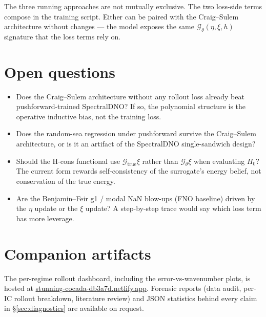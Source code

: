 \documentclass[11pt,letterpaper]{article}
\newcommand{\Gop}{\mathcal{G}}
\begin{document}
\noindent
The three running approaches are not mutually exclusive. The two
loss-side terms compose in the training script. Either can be paired
with the Craig--Sulem architecture without changes --- the model exposes
the same $\Gop_\theta(\eta,\xi,h)$ signature that the loss terms rely on.

\section{Open questions}

\begin{itemize}[leftmargin=1.3em,itemsep=3pt]
  \item Does the Craig--Sulem architecture without any rollout loss
        already beat pushforward-trained SpectralDNO? If so, the
        polynomial structure is the operative inductive bias, not the
        training loss.
  \item Does the random-sea regression under pushforward survive the
        Craig--Sulem architecture, or is it an artifact of the
        SpectralDNO single-sandwich design?
  \item Should the H-cons functional use $\Gop_{\mathrm{true}}\xi$ rather
        than $\Gop_{\theta}\xi$ when evaluating $H_{0}$? The current
        form rewards self-consistency of the surrogate's energy belief,
        not conservation of the true energy.
  \item Are the Benjamin--Feir g1 / modal NaN blow-ups (FNO baseline)
        driven by the $\eta$ update or the $\xi$ update? A step-by-step
        trace would say which loss term has more leverage.
\end{itemize}

\section*{Companion artifacts}

The per-regime rollout dashboard, including the error-vs-wavenumber
plots, is hosted at
\href{https://stunning-cocada-db3a7d.netlify.app}{stunning-cocada-db3a7d.netlify.app}.
Forensic reports (data audit, per-IC rollout breakdown, literature
review) and JSON statistics behind every claim in
\S\ref{sec:diagnostics} are available on request.
\end{document}
